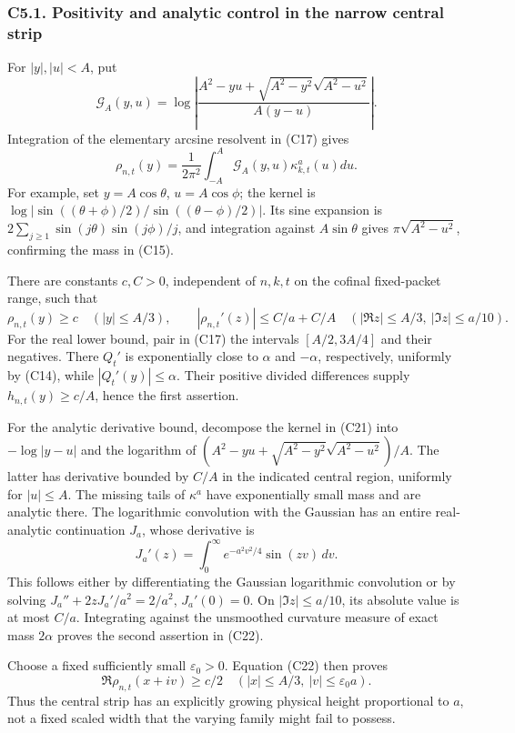 \documentclass[11pt,a4paper]{article}
\begin{document}
\subsubsection{C5.1. Positivity and analytic control in the narrow
central
strip}\label{sa:c5.1.-positivity-and-analytic-control-in-the-narrow-central-strip}

For \(|y|,|u|<A\), put \[
\mathcal G_A(y,u)=
\log\left|\frac{A^2-yu+\sqrt{A^2-y^2}\sqrt{A^2-u^2}}
{A(y-u)}\right|.
\] Integration of the elementary arcsine resolvent in (C17) gives \[
\rho_{n,t}(y)=\frac1{2\pi^2}\int_{-A}^A
\mathcal G_A(y,u)\kappa^a_{k,t}(u)du.\tag{C21}
\] For example, set \(y=A\cos\theta\), \(u=A\cos\phi\); the kernel is
\(\log|\sin((\theta+\phi)/2)/\sin((\theta-\phi)/2)|\). Its sine
expansion is \(2\sum_{j\ge1}\sin(j\theta)\sin(j\phi)/j\), and
integration against \(A\sin\theta\) gives \(\pi\sqrt{A^2-u^2}\),
confirming the mass in (C15).

There are constants \(c,C>0\), independent of \(n,k,t\) on the cofinal
fixed-packet range, such that \[
\rho_{n,t}(y)\ge c\quad(|y|\le A/3),
\qquad
|\rho_{n,t}'(z)|\le C/a+C/A
\quad(|\Re z|\le A/3,\ |\Im z|\le a/10).
\tag{C22}
\] For the real lower bound, pair in (C17) the intervals \([A/2,3A/4]\)
and their negatives. There \(Q_t'\) is exponentially close to \(\alpha\)
and \(-\alpha\), respectively, uniformly by (C14), while
\(|Q_t'(y)|\le\alpha\). Their positive divided differences supply
\(h_{n,t}(y)\ge c/A\), hence the first assertion.

For the analytic derivative bound, decompose the kernel in (C21) into
\(-\log|y-u|\) and the logarithm of
\((A^2-yu+\sqrt{A^2-y^2}\sqrt{A^2-u^2})/A\). The latter has derivative
bounded by \(C/A\) in the indicated central region, uniformly for
\(|u|\le A\). The missing tails of \(\kappa^a\) have exponentially small
mass and are analytic there. The logarithmic convolution with the
Gaussian has an entire real-analytic continuation \(J_a\), whose
derivative is \[
J_a'(z)=\int_0^\infty e^{-a^2v^2/4}\sin(zv)\,dv.
\] This follows either by differentiating the Gaussian logarithmic
convolution or by solving \(J_a''+2zJ_a'/a^2=2/a^2\), \(J_a'(0)=0\). On
\(|\Im z|\le a/10\), its absolute value is at most \(C/a\). Integrating
against the unsmoothed curvature measure of exact mass \(2\alpha\)
proves the second assertion in (C22).

Choose a fixed sufficiently small \(\varepsilon_0>0\). Equation (C22)
then proves \[
\Re\rho_{n,t}(x+iv)\ge c/2
\quad(|x|\le A/3,\ |v|\le\varepsilon_0a).\tag{C23}
\] Thus the central strip has an explicitly growing physical height
proportional to \(a\), not a fixed scaled width that the varying family
might fail to possess.
\end{document}
